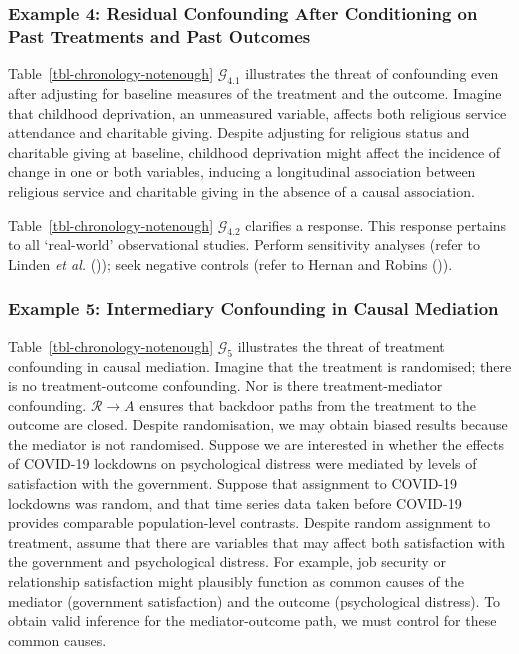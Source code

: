\documentclass[
  single column]{article}
\begin{document}
\subsubsection{Example 4: Residual Confounding After Conditioning on
Past Treatments and Past
Outcomes}\label{example-4-residual-confounding-after-conditioning-on-past-treatments-and-past-outcomes}

Table~\ref{tbl-chronology-notenough} \(\mathcal{G}_{4.1}\) illustrates
the threat of confounding even after adjusting for baseline measures of
the treatment and the outcome. Imagine that childhood deprivation, an
unmeasured variable, affects both religious service attendance and
charitable giving. Despite adjusting for religious status and charitable
giving at baseline, childhood deprivation might affect the incidence of
change in one or both variables, inducing a longitudinal association
between religious service and charitable giving in the absence of a
causal association.

Table~\ref{tbl-chronology-notenough} \(\mathcal{G}_{4.2}\) clarifies a
response. This response pertains to all `real-world' observational
studies. Perform sensitivity analyses (refer to Linden \emph{et al.}
()); seek negative controls (refer
to Hernan and Robins ()).

\subsubsection{Example 5: Intermediary Confounding in Causal
Mediation}\label{example-5-intermediary-confounding-in-causal-mediation}

Table~\ref{tbl-chronology-notenough} \(\mathcal{G}_5\) illustrates the
threat of treatment confounding in causal mediation. Imagine that the
treatment is randomised; there is no treatment-outcome confounding. Nor
is there treatment-mediator confounding. \(\mathcal{R} \to A\) ensures
that backdoor paths from the treatment to the outcome are closed.
Despite randomisation, we may obtain biased results because the mediator
is not randomised. Suppose we are interested in whether the effects of
COVID-19 lockdowns on psychological distress were mediated by levels of
satisfaction with the government. Suppose that assignment to COVID-19
lockdowns was random, and that time series data taken before COVID-19
provides comparable population-level contrasts. Despite random
assignment to treatment, assume that there are variables that may affect
both satisfaction with the government and psychological distress. For
example, job security or relationship satisfaction might plausibly
function as common causes of the mediator (government satisfaction) and
the outcome (psychological distress). To obtain valid inference for the
mediator-outcome path, we must control for these common causes.
\end{document}
